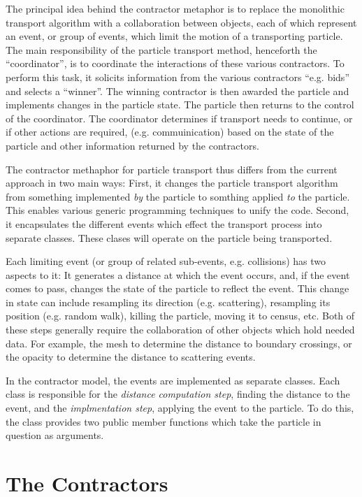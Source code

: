 \documentclass[memo]{ResearchNote}
\begin{document}
The principal idea behind the contractor metaphor is to replace the
monolithic transport algorithm with a collaboration between objects,
each of which represent an event, or group of events, which limit the
motion of a transporting particle. The main responsibility of the
particle transport method, henceforth the ``coordinator'', is to
coordinate the interactions of these various contractors. To perform
this task, it solicits information from the various contractors ``e.g.
bids'' and selects a ``winner''. The winning contractor is then
awarded the particle and implements changes in the particle state. The
particle then returns to the control of the coordinator. The
coordinator determines if transport needs to continue, or if other
actions are required, (e.g. commuinication) based on the state of the
particle and other information returned by the contractors.

The contractor methaphor for particle transport thus differs from the
current approach in two main ways: First, it changes the particle
transport algorithm from something implemented {\em by} the particle
to somthing applied {\em to} the particle. This enables various
generic programming techniques to unify the code.  Second, it
encapsulates the different events which effect the transport process
into separate classes. These clases will operate on the particle being
transported.

Each limiting event (or group of related sub-events, e.g. collisions)
has two aspects to it: It generates a distance at which the event
occurs, and, if the event comes to pass, changes the state of the
particle to reflect the event. This change in state can include
resampling its direction (e.g. scattering), resampling its position
(e.g. random walk), killing the particle, moving it to census, etc.
Both of these steps generally require the collaboration of other
objects which hold needed data. For example, the mesh to determine the
distance to boundary crossings, or the opacity to determine the
distance to scattering events.

In the contractor model, the events are implemented as separate
classes. Each class is responsible for the {\em distance computation
  step}, finding the distance to the event, and the {\em implmentation
  step}, applying the event to the particle. To do this, the class
provides two public member functions which take the particle in
question as arguments.

\section{The Contractors}
\end{document}
